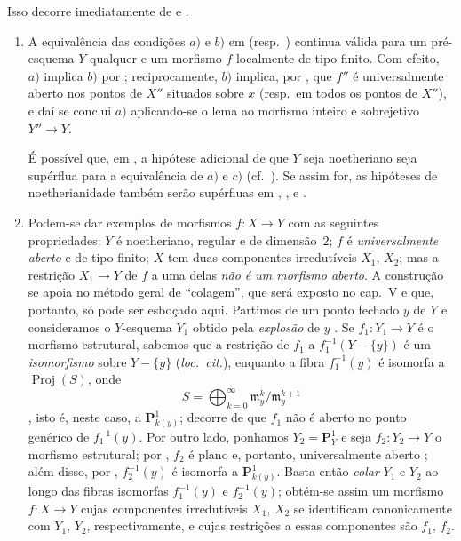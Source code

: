 Isso decorre imediatamente de  e .

\begin{remarks}[14.4.10]
\label{IV.14.4.10}
\begin{enumerate}[label=(\roman*)]
  \item A equivalência das condições $a)$ e $b)$ em  (resp.\ ) continua válida para um pré-esquema $Y$ qualquer e um morfismo $f$ localmente de tipo finito.
  Com efeito, $a)$ implica $b)$ por ; reciprocamente, $b)$ implica, por , que $f''$ é universalmente aberto nos pontos de $X''$ situados sobre $x$ (resp.\ em todos os pontos de $X''$), e daí se conclui $a)$ aplicando-se o lema  ao morfismo inteiro e sobrejetivo $Y''\to Y$.

  É possível que, em , a hipótese adicional de que $Y$ seja noetheriano seja supérflua para a equivalência de $a)$ e $c)$ (cf.\ ).
  Se assim for, as hipóteses de noetherianidade também serão supérfluas em , ,  e .

  \item Podem-se dar exemplos de morfismos $f:X\to Y$ com as seguintes propriedades: $Y$ é noetheriano, regular e de dimensão~$2$; $f$ é \emph{universalmente aberto} e de tipo finito; $X$ tem duas componentes irredutíveis $X_1$, $X_2$; mas a restrição $X_1\to Y$ de $f$ a uma delas \emph{não é um morfismo aberto}.
  A construção se apoia no método geral de “colagem”, que será exposto no cap.~V e que, portanto, só pode ser esboçado aqui.
  Partimos de um ponto fechado $y$ de $Y$ e consideramos o $Y$-esquema $Y_1$ obtido pela \emph{explosão} de $y$ .
  Se $f_1:Y_1\to Y$ é o morfismo estrutural, sabemos que a restrição de $f_1$ a $f_1^{-1}(Y-\{y\})$ é um \emph{isomorfismo} sobre $Y-\{y\}$ (\emph{loc.\ cit.}), enquanto a fibra $f_1^{-1}(y)$ é isomorfa a $\operatorname{Proj}(S)$, onde
  \[
    S=\bigoplus_{k=0}^{\infty}\mathfrak m_y^k/\mathfrak m_y^{k+1}
  \]
  , isto é, neste caso, a $\mathbf P^1_{k(y)}$; decorre de  que $f_1$ não é aberto no ponto genérico de $f_1^{-1}(y)$.
  Por outro lado, ponhamos $Y_2=\mathbf P^1_Y$ e seja $f_2:Y_2\to Y$ o morfismo estrutural; por , $f_2$ é plano e, portanto, universalmente aberto ; além disso, por , $f_2^{-1}(y)$ é isomorfa a $\mathbf P^1_{k(y)}$.
  Basta então \emph{colar} $Y_1$ e $Y_2$ ao longo das fibras isomorfas $f_1^{-1}(y)$ e $f_2^{-1}(y)$; obtém-se assim um morfismo $f:X\to Y$ cujas componentes irredutíveis $X_1$, $X_2$ se identificam canonicamente com $Y_1$, $Y_2$, respectivamente, e cujas restrições a essas componentes são $f_1$, $f_2$.


\end{enumerate}
\end{remarks}
